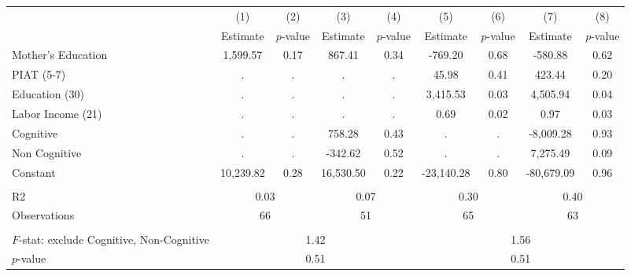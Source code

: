 \begin{tabular}{lcccccccc} \toprule
 & (1) & (2) & (3) & (4) & (5) & (6) & (7) & (8) \\
 & Estimate & $p$-value & Estimate & $p$-value  & Estimate & $p$-value  & Estimate & $p$-value  \\ \midrule 
Mother's Education &     1,599.57 &         0.17 &       867.41 &         0.34 &      -769.20 &         0.68 &      -580.88 &         0.62 \\  
PIAT (5-7) &            . &            . &            . &            . &        45.98 &         0.41 &       423.44 &         0.20 \\  
Education (30) &            . &            . &            . &            . &     3,415.53 &         0.03 &     4,505.94 &         0.04 \\  
Labor Income (21) &            . &            . &            . &            . &         0.69 &         0.02 &         0.97 &         0.03 \\  
Cognitive &            . &            . &       758.28 &         0.43 &            . &            . &    -8,009.28 &         0.93 \\  
Non Cognitive &            . &            . &      -342.62 &         0.52 &            . &            . &     7,275.49 &         0.09 \\  
Constant &    10,239.82 &         0.28 &    16,530.50 &         0.22 &   -23,140.28 &         0.80 &   -80,679.09 &         0.96 \\  \\ \midrule
R2 &         \multicolumn{2}{c}{0.03} &              \multicolumn{2}{c}{0.07} &             \multicolumn{2}{c}{0.30} &               \multicolumn{2}{c}{0.40}  \\  
Observations &         \multicolumn{2}{c}{66} &          \multicolumn{2}{c}{51} &              \multicolumn{2}{c}{65} &             \multicolumn{2}{c}{63}  \\  \\ \midrule
$F$-stat: exclude Cognitive, Non-Cognitive &              \multicolumn{4}{c}{1.42} &               \multicolumn{4}{c}{1.56}  \\  
$p$-value  &         \multicolumn{4}{c}{0.51} &                   \multicolumn{4}{c}{0.51} \\      \bottomrule \end{tabular}

